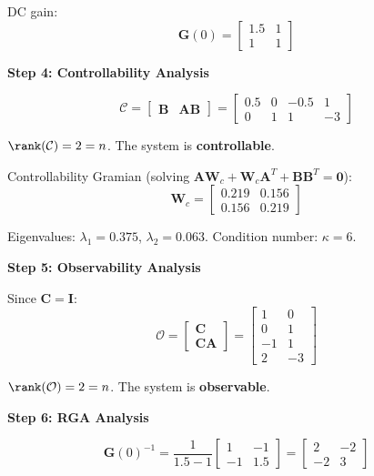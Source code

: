 DC gain:
\begin{equation}
\mathbf{G}(0) = \begin{bmatrix} 1.5 & 1 \\ 1 & 1 \end{bmatrix}
\end{equation}

\textbf{Step 4: Controllability Analysis}

\begin{equation}
\mathcal{C} = \begin{bmatrix} \mathbf{B} & \mathbf{A}\mathbf{B} \end{bmatrix} = \begin{bmatrix} 0.5 & 0 & -0.5 & 1 \\ 0 & 1 & 1 & -3 \end{bmatrix}
\end{equation}

$\rank(\mathcal{C}) = 2 = n$. The system is \textbf{controllable}.

Controllability Gramian (solving $\mathbf{A}\mathbf{W}_c + \mathbf{W}_c\mathbf{A}^T + \mathbf{B}\mathbf{B}^T = \mathbf{0}$):
\begin{equation}
\mathbf{W}_c = \begin{bmatrix} 0.219 & 0.156 \\ 0.156 & 0.219 \end{bmatrix}
\end{equation}

Eigenvalues: $\lambda_1 = 0.375$, $\lambda_2 = 0.063$. Condition number: $\kappa = 6$.

\textbf{Step 5: Observability Analysis}

Since $\mathbf{C} = \mathbf{I}$:
\begin{equation}
\mathcal{O} = \begin{bmatrix} \mathbf{C} \\ \mathbf{C}\mathbf{A} \end{bmatrix} = \begin{bmatrix} 1 & 0 \\ 0 & 1 \\ -1 & 1 \\ 2 & -3 \end{bmatrix}
\end{equation}

$\rank(\mathcal{O}) = 2 = n$. The system is \textbf{observable}.

\textbf{Step 6: RGA Analysis}

\begin{equation}
\mathbf{G}(0)^{-1} = \frac{1}{1.5 - 1}\begin{bmatrix} 1 & -1 \\ -1 & 1.5 \end{bmatrix} = \begin{bmatrix} 2 & -2 \\ -2 & 3 \end{bmatrix}
\end{equation}

